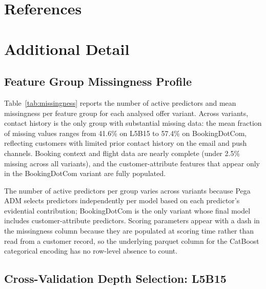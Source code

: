 \documentclass[oneside]{memoir} %
\begin{document}
\chapter{References}
\linespread{1.25} %
\printbibliography[heading = none]


\appendix

\chapter{Additional Detail}
\renewcommand{\thetable}{A.\arabic{table}}
\setcounter{table}{0}
\renewcommand{\thefigure}{A.\arabic{figure}}
\setcounter{figure}{0}
\renewcommand{\thesection}{A.\arabic{section}}

\section{Feature Group Missingness Profile} \label{app:missingness}

Table~\ref{tab:missingness} reports the number of active predictors and mean missingness per feature group for each analysed offer variant. Across variants, contact history is the only group with substantial missing data: the mean fraction of missing values ranges from 41.6\% on L5B15 to 57.4\% on BookingDotCom, reflecting customers with limited prior contact history on the email and push channels. Booking context and flight data are nearly complete (under 2.5\% missing across all variants), and the customer-attribute features that appear only in the BookingDotCom variant are fully populated.

The number of active predictors per group varies across variants because Pega ADM selects predictors independently per model based on each predictor's evidential contribution; BookingDotCom is the only variant whose final model includes customer-attribute predictors. Scoring parameters appear with a dash in the missingness column because they are populated at scoring time rather than read from a customer record, so the underlying parquet column for the CatBoost categorical encoding has no row-level absence to count.




\section{Cross-Validation Depth Selection: L5B15} \label{app:cv_depth}
\end{document}
